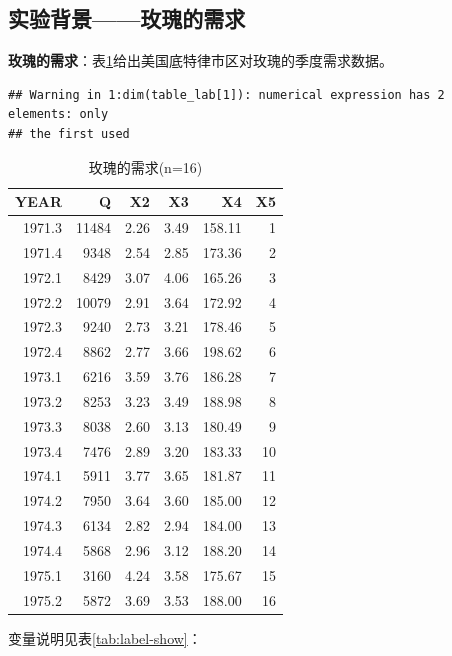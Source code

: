 \documentclass[12pt,(landscape,a4paper),(portrait,a4paper)]{article}
\begin{document}
\newpage

\subsection{实验背景------玫瑰的需求}

\textbf{玫瑰的需求}：表\ref{tab:rose-demand}给出美国底特律市区对玫瑰的季度需求数据。

\begin{verbatim}
## Warning in 1:dim(table_lab[1]): numerical expression has 2 elements: only
## the first used
\end{verbatim}

\begin{table}

\caption{\label{tab:rose-demand}玫瑰的需求(n=16)}
\centering
\begin{tabular}[t]{r|r|r|r|r|r}
\hline
YEAR & Q & X2 & X3 & X4 & X5\\
\hline
1971.3 & 11484 & 2.26 & 3.49 & 158.11 & 1\\
\hline
1971.4 & 9348 & 2.54 & 2.85 & 173.36 & 2\\
\hline
1972.1 & 8429 & 3.07 & 4.06 & 165.26 & 3\\
\hline
1972.2 & 10079 & 2.91 & 3.64 & 172.92 & 4\\
\hline
1972.3 & 9240 & 2.73 & 3.21 & 178.46 & 5\\
\hline
1972.4 & 8862 & 2.77 & 3.66 & 198.62 & 6\\
\hline
1973.1 & 6216 & 3.59 & 3.76 & 186.28 & 7\\
\hline
1973.2 & 8253 & 3.23 & 3.49 & 188.98 & 8\\
\hline
1973.3 & 8038 & 2.60 & 3.13 & 180.49 & 9\\
\hline
1973.4 & 7476 & 2.89 & 3.20 & 183.33 & 10\\
\hline
1974.1 & 5911 & 3.77 & 3.65 & 181.87 & 11\\
\hline
1974.2 & 7950 & 3.64 & 3.60 & 185.00 & 12\\
\hline
1974.3 & 6134 & 2.82 & 2.94 & 184.00 & 13\\
\hline
1974.4 & 5868 & 2.96 & 3.12 & 188.20 & 14\\
\hline
1975.1 & 3160 & 4.24 & 3.58 & 175.67 & 15\\
\hline
1975.2 & 5872 & 3.69 & 3.53 & 188.00 & 16\\
\hline
\end{tabular}
\end{table}

变量说明见表\ref{tab:label-show}：
\end{document}
